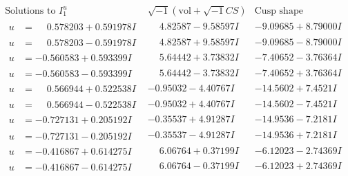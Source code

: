 \documentclass[1p]{elsarticle_modified}
\theoremstyle{definition}
\newcommand{\I}{\sqrt{-1}}
\begin{document}
$$\begin{array}{c|c|c}  
\text{Solutions to }I^u_{1}& \I (\text{vol} + \sqrt{-1}CS) & \text{Cusp shape}\\
 \hline 
\begin{aligned}
u &= \phantom{-}0.578203 + 0.591978 I\end{aligned}
 & \phantom{-}4.82587 - 9.58597 I & -9.09685 + 8.79000 I \\ \hline\begin{aligned}
u &= \phantom{-}0.578203 - 0.591978 I\end{aligned}
 & \phantom{-}4.82587 + 9.58597 I & -9.09685 - 8.79000 I \\ \hline\begin{aligned}
u &= -0.560583 + 0.593399 I\end{aligned}
 & \phantom{-}5.64442 + 3.73832 I & -7.40652 - 3.76364 I \\ \hline\begin{aligned}
u &= -0.560583 - 0.593399 I\end{aligned}
 & \phantom{-}5.64442 - 3.73832 I & -7.40652 + 3.76364 I \\ \hline\begin{aligned}
u &= \phantom{-}0.566944 + 0.522538 I\end{aligned}
 & -0.95032 - 4.40767 I & -14.5602 + 7.4521 I \\ \hline\begin{aligned}
u &= \phantom{-}0.566944 - 0.522538 I\end{aligned}
 & -0.95032 + 4.40767 I & -14.5602 - 7.4521 I \\ \hline\begin{aligned}
u &= -0.727131 + 0.205192 I\end{aligned}
 & -0.35537 + 4.91287 I & -14.9536 - 7.2181 I \\ \hline\begin{aligned}
u &= -0.727131 - 0.205192 I\end{aligned}
 & -0.35537 - 4.91287 I & -14.9536 + 7.2181 I \\ \hline\begin{aligned}
u &= -0.416867 + 0.614275 I\end{aligned}
 & \phantom{-}6.06764 + 0.37199 I & -6.12023 - 2.74369 I \\ \hline\begin{aligned}
u &= -0.416867 - 0.614275 I\end{aligned}
 & \phantom{-}6.06764 - 0.37199 I & -6.12023 + 2.74369 I \\ \hline\begin{aligned}

\end{aligned}
\end{array}$$
\end{document}
